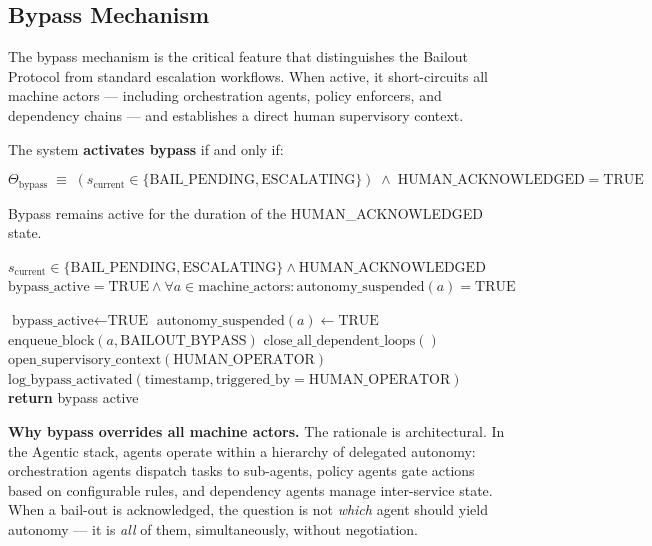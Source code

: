 \subsection{Bypass Mechanism}

\label{bypass}
The bypass mechanism is the critical feature that distinguishes the Bailout Protocol from standard escalation workflows. When active, it short-circuits all machine actors — including orchestration agents, policy enforcers, and dependency chains — and establishes a direct human supervisory context.

\begin{definition}
\label{def:bypass}
The system \textbf{activates bypass} if and only if:

\[
\Theta_{\text{bypass}} \;\equiv\; (s_{\text{current}} \in \{\text{BAIL\_PENDING}, \text{ESCALATING}\}) \;\land\; \text{HUMAN\_ACKNOWLEDGED} = \text{TRUE}
\]

Bypass remains active for the duration of the HUMAN\_ACKNOWLEDGED state.
\end{definition}

\begin{algorithm}[H]
\caption{Bypass Activation Algorithm}
\label{alg:bypass}
\begin{algorithmic}[1]
\REQUIRE $s_{\text{current}} \in \{\text{BAIL\_PENDING}, \text{ESCALATING}\} \land \text{HUMAN\_ACKNOWLEDGED}$
\ENSURE $\text{bypass\_active} = \text{TRUE} \land \forall a \in \text{machine\_actors}: \text{autonomy\_suspended}(a) = \text{TRUE}$

\STATE $\text{bypass\_active} \gets \text{TRUE}$
\STATE $\text{autonomy\_suspended}(a) \gets \text{TRUE}$
\STATE $\text{enqueue\_block}(a, \text{BAILOUT\_BYPASS})$
\ENDFOR
\STATE $\text{close\_all\_dependent\_loops}()$
\STATE $\text{open\_supervisory\_context}(\text{HUMAN\_OPERATOR})$
\STATE $\text{log\_bypass\_activated}(\text{timestamp}, \text{triggered\_by} = \text{HUMAN\_OPERATOR})$
\STATE \textbf{return} bypass active
\end{algorithmic}
\end{algorithm}

\bigskip
\textbf{Why bypass overrides all machine actors.} The rationale is architectural. In the Agentic stack, agents operate within a hierarchy of delegated autonomy: orchestration agents dispatch tasks to sub-agents, policy agents gate actions based on configurable rules, and dependency agents manage inter-service state. When a bail-out is acknowledged, the question is not \emph{which} agent should yield autonomy — it is \emph{all} of them, simultaneously, without negotiation.

